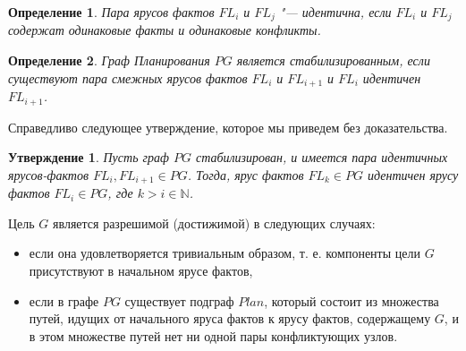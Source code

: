 \documentclass[b5paper,11pt]{book}
\newtheorem{Def}{Определение}
\newtheorem{St}{Утверждение}
\begin{document}
	\begin{Def}
		Пара ярусов фактов $FL_i$ и $FL_j$ "--- идентична, если $FL_i$ и $FL_j$ содержат одинаковые факты и одинаковые конфликты.
	\end{Def}
		
	\begin{Def}
		Граф Планирования $PG$ является стабилизированным, если существуют пара смежных ярусов фактов $FL_i$ и $FL_{i + 1}$ и $FL_i$ идентичен $FL_{i + 1}$.
	\end{Def}
	
	Справедливо следующее утверждение, которое мы приведем без доказательства.
	
	\begin{St}
		Пусть граф $PG$ стабилизирован, и имеется пара идентичных ярусов-фактов $FL_i, FL_{i + 1} \in PG$. Тогда, ярус фактов $FL_k\in PG$ идентичен ярусу фактов $FL_i\in PG$, где $k > i \in \mathbb{N}$.
	\end{St}
	
	Цель $G$ является разрешимой (достижимой) в следующих случаях: 
	\begin{itemize}
		\item если она удовлетворяется тривиальным образом, т. е. компоненты цели $G$ присутствуют в начальном ярусе фактов, 
		\item если в графе $PG$ существует подграф $Plan$, который состоит из множества путей, идущих от начального яруса
		фактов к ярусу фактов, содержащему $G$, и в этом множестве путей нет ни одной пары конфликтующих узлов.
	\end{itemize}
		
\end{document}
